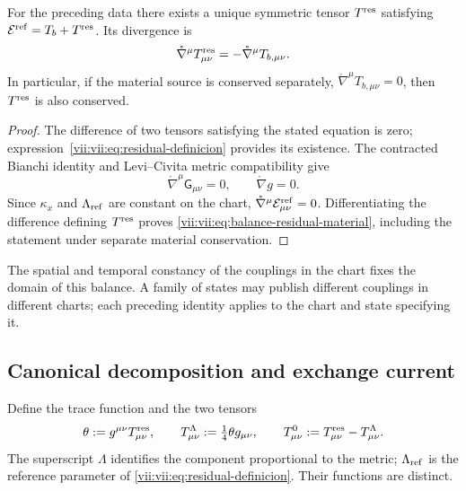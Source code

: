 \begin{theorem}
\label{vii:vii:thm:residual-unicidad-balance}
For the preceding data there exists a unique symmetric tensor
\(T^{\rm res}\) satisfying
\(\mathcal E^{\rm ref}=T_b+T^{\rm res}\). Its divergence is
\begin{equation}
 \mathring\nabla^\mu T^{\rm res}_{\mu\nu}
 =-\mathring\nabla^\mu T_{b,\mu\nu}.
 \label{vii:vii:eq:balance-residual-material}
\end{equation}
In particular, if the material source is conserved separately,
\(\mathring\nabla^\mu T_{b,\mu\nu}=0\), then
\(T^{\rm res}\) is also conserved.
\end{theorem}
\begin{proof}
The difference of two tensors satisfying the stated equation is
zero; expression~\eqref{vii:vii:eq:residual-definicion} provides its
existence. The contracted Bianchi identity and Levi--Civita metric
compatibility give
\[
 \mathring\nabla^\mu\mathsf G_{\mu\nu}=0,
 \qquad \mathring\nabla g=0.
\]
Since \(\kappa_x\) and \(\Lambda_{\rm ref}\) are constant on the
chart, \(\mathring\nabla^\mu\mathcal E^{\rm ref}_{\mu\nu}=0\).
Differentiating the difference defining \(T^{\rm res}\) proves
\eqref{vii:vii:eq:balance-residual-material}, including the statement under
separate material conservation.
\end{proof}

The spatial and temporal constancy of the couplings in the chart fixes
the domain of this balance. A family of states may publish
different couplings in different charts; each preceding identity
applies to the chart and state specifying it.

\subsection{Canonical decomposition and exchange current}
\label{vii:vii:subsec:traza-corriente-residual}

Define the trace function and the two tensors
\begin{equation}
 \theta:=g^{\mu\nu}T^{\rm res}_{\mu\nu},\qquad
 T^{\Lambda}_{\mu\nu}:=\tfrac14\theta g_{\mu\nu},\qquad
 T^{0}_{\mu\nu}:=T^{\rm res}_{\mu\nu}-T^{\Lambda}_{\mu\nu}.
 \label{vii:vii:eq:descomposicion-traza-residual}
\end{equation}
The superscript \(\Lambda\) identifies the component proportional to the
metric; \(\Lambda_{\rm ref}\) is the reference parameter of
\eqref{vii:vii:eq:residual-definicion}. Their functions are distinct.

